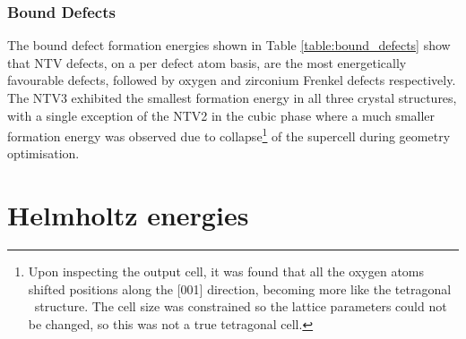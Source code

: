 %


\subsubsection*{Bound Defects}
The bound defect formation energies shown in Table \ref{table:bound_defects} show that NTV defects, on a per defect atom basis, are the most energetically favourable defects, followed by oxygen and zirconium Frenkel defects respectively. The NTV3 exhibited the smallest formation energy in all three crystal structures, with a single exception of the NTV2 in the cubic phase where a much smaller formation energy was observed due to collapse\footnote{Upon inspecting the output cell, it was found that all the oxygen atoms shifted positions along the [001] direction, becoming more like the tetragonal \zirconia\ structure. The cell size was constrained so the lattice parameters could not be changed, so this was not a true tetragonal cell.} of the supercell during geometry optimisation.


\section{Helmholtz energies}


